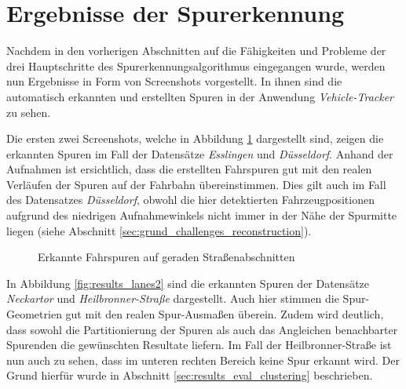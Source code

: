 \section{Ergebnisse der Spurerkennung}

Nachdem in den vorherigen Abschnitten auf die Fähigkeiten und Probleme der drei Hauptschritte des
Spurerkennungsalgorithmus eingegangen wurde, werden nun Ergebnisse in Form von Screenshots vorgestellt.
In ihnen sind die automatisch erkannten und erstellten Spuren in der Anwendung \textit{Vehicle-Tracker} zu sehen.

Die ersten zwei Screenshots, welche in Abbildung \ref{fig:results_lanes1} dargestellt sind, zeigen die erkannten
Spuren im Fall der Datensätze \textit{Esslingen} und \textit{Düsseldorf}.
Anhand der Aufnahmen ist ersichtlich, dass die erstellten Fahrspuren gut mit den realen Verläufen der
Spuren auf der Fahrbahn übereinstimmen.
Dies gilt auch im Fall des Datensatzes \textit{Düsseldorf}, obwohl die hier detektierten Fahrzeugpositionen
aufgrund des niedrigen Aufnahmewinkels nicht immer in der Nähe der Spurmitte liegen
(siehe Abschnitt \ref{sec:grund_challenges_reconstruction}).

\begin{figure}[H]
    \centering
    \caption{Erkannte Fahrspuren auf geraden Straßenabschnitten}
    \label{fig:results_lanes1}
\end{figure}

In Abbildung \ref{fig:results_lanes2} sind die erkannten Spuren der Datensätze \textit{Neckartor} und \textit{Heilbronner-Straße}
dargestellt. Auch hier stimmen die Spur-Geometrien gut mit den realen Spur-Ausmaßen überein. Zudem wird deutlich,
dass sowohl die Partitionierung der Spuren als auch das Angleichen benachbarter Spurenden die gewünschten Resultate liefern.
Im Fall der Heilbronner-Straße ist nun auch zu sehen, dass im unteren rechten Bereich keine Spur erkannt wird.
Der Grund hierfür wurde in Abschnitt \ref{sec:results_eval_clustering} beschrieben.

